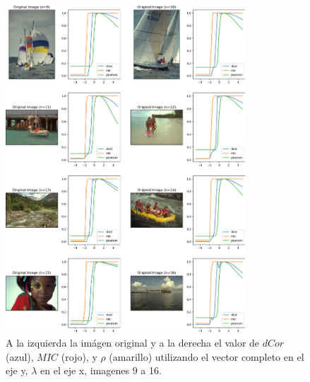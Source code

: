 \begin{figure}
    \centering
    \includegraphics[width=0.8\textwidth]{figuras/full_comp_2.png}
    \caption{A la izquierda la im\'agen original y a la derecha el valor de $dCor$ (azul), $MIC$ (rojo), y $\rho$ (amarillo) utilizando el vector completo en el eje y, $\lambda$ en el eje x, imagenes 9 a 16.}
\end{figure}


